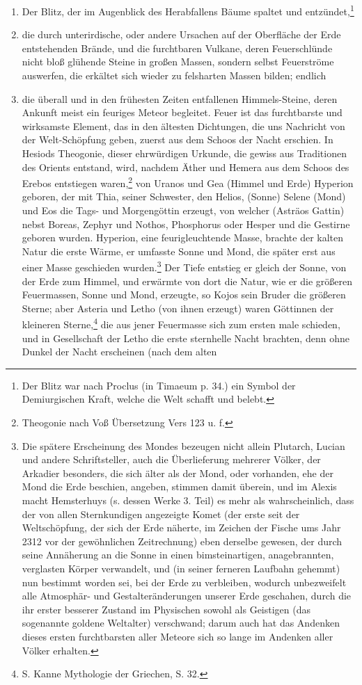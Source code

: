 \documentclass[a4paper, 11pt, oneside, polutonikogreek, german]{article}
\begin{document}
\begin{enumerate}
    \item Der Blitz, der im Augenblick des Herabfallens Bäume spaltet und entzündet,\footnote{Der Blitz war nach Proclus (in Timaeum p. 34.) ein Symbol der Demiurgischen Kraft, welche die Welt schafft und belebt.}
    \item die durch unterirdische, oder andere Ursachen auf der Oberfläche der Erde entstehenden Brände, und die furchtbaren Vulkane, deren Feuerschlünde nicht bloß glühende Steine in großen Massen, sondern selbst Feuerströme auswerfen, die erkältet sich wieder zu felsharten Massen bilden; endlich
    \item die überall und in den frühesten Zeiten entfallenen Himmels-Steine, deren Ankunft meist ein feuriges Meteor begleitet. Feuer ist das furchtbarste und wirksamste Element, das in den ältesten Dichtungen, die uns Nachricht von der Welt-Schöpfung geben, zuerst aus dem Schoos der Nacht erschien. In Hesiods Theogonie, dieser ehrwürdigen Urkunde, die gewiss aus Traditionen des Orients entstand, wird, nachdem Äther und Hemera aus dem Schoos des Erebos entstiegen waren,\footnote{Theogonie nach Voß Übersetzung Vers 123 u. f.} von Uranos und Gea (Himmel und Erde) Hyperion geboren, der mit Thia, seiner Schwester, den Helios, (Sonne) Selene (Mond) und Eos die Tags- und Morgengöttin erzeugt, von welcher (Asträos Gattin) nebst Boreas, Zephyr und Nothos, Phosphorus oder Hesper und die Gestirne geboren wurden. Hyperion, eine feurigleuchtende Masse, brachte der kalten Natur die erste Wärme, er umfasste Sonne und Mond, die später erst aus einer Masse geschieden wurden.\footnote{Die spätere Erscheinung des Mondes bezeugen nicht allein Plutarch, Lucian und andere Schriftsteller, auch die Überlieferung mehrerer Völker, der Arkadier besonders, die sich älter als der Mond, oder vorhanden, ehe der Mond die Erde beschien, angeben, stimmen damit überein, und im Alexis macht Hemsterhuys (s. dessen Werke 3. Teil) es mehr als wahrscheinlich, dass der von allen Sternkundigen angezeigte Komet (der erste seit der Weltschöpfung, der sich der Erde näherte, im Zeichen der Fische ums Jahr 2312 vor der gewöhnlichen Zeitrechnung) eben derselbe gewesen, der durch seine Annäherung an die Sonne in einen bimsteinartigen, anagebrannten, verglasten Körper verwandelt, und (in seiner ferneren Laufbahn gehemmt) nun bestimmt worden sei, bei der Erde zu verbleiben, wodurch unbezweifelt alle Atmosphär- und Gestalteränderungen unserer Erde geschahen, durch die ihr erster besserer Zustand im Physischen sowohl als Geistigen (das sogenannte goldene Weltalter) verschwand; darum auch hat das Andenken dieses ersten furchtbarsten aller Meteore sich so lange im Andenken aller Völker erhalten.} Der Tiefe entstieg er gleich der Sonne, von der Erde zum Himmel, und erwärmte von dort die Natur, wie er die größeren Feuermassen, Sonne und Mond, erzeugte, so Kojos sein Bruder die größeren Sterne; aber Asteria und Letho (von ihnen erzeugt) waren Göttinnen der kleineren Sterne,\footnote{S. Kanne Mythologie der Griechen, S. 32.} die aus jener Feuermasse sich zum ersten male schieden, und in Gesellschaft der Letho die erste sternhelle Nacht brachten, denn ohne Dunkel der Nacht erscheinen (nach dem alten 
\end{enumerate}
\end{document}
